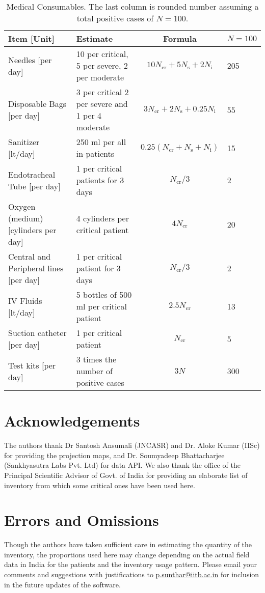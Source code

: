 \documentclass{article}
\newcommand{\email}[1]{\href{mailto:#1}{#1}}
\newcommand{\ncr}{\ensuremath{N_{\mathrm{cr}}}}
\newcommand{\ns}{\ensuremath{N_{\mathrm{s}}}}
\newcommand{\nin}{\ensuremath{N_{\mathrm{i}}}}
\begin{document}
\begin{landscape}
\begin{table}
  \caption{Medical Consumables. The last column is
    rounded number assuming a total positive cases of $N=100$.}
  \begin{tabularx}{\linewidth}{XXcl}
    \toprule
    Item [Unit] & Estimate & Formula & $N=100$ \\
    \midrule
Needles [per day]& 10 per critical, 5 per severe, 2 per moderate&
$10 \ncr + 5 \ns + 2 \nin$ & 205 \\
Disposable Bags [per day] & 3 per critical 2 per severe and 1 per 4
moderate & $ 3\ncr + 2\ns + 0.25\nin$ & 55 \\
Sanitizer [lt/day] & 250 ml per all in-patients & $0.25 (\ncr+\ns+\nin)$
& 15 \\
Endotracheal Tube [per day] & 1 per critical patients for 3 days &
$\ncr/3$ & 2 \\
Oxygen (medium) [cylinders per day] & 4 cylinders per critical patient
& $4 \ncr$  & 20 \\ 
Central and Peripheral lines [per day] & 1 per critical patient for 3
days & $\ncr/3$ & 2 \\
IV Fluids [lt/day] & 5 bottles of 500 ml per critical patient &
$2.5 \ncr$ & 13 \\
Suction catheter [per day] & 1 per critical patient & $\ncr$ & 5 \\
Test kits [per day] & 3 times the number of positive cases &
$3 N$ & 300  \\
\bottomrule
\end{tabularx}
\end{table}
\end{landscape}

\section{Acknowledgements}
The authors thank Dr Santosh Ansumali (JNCASR) and Dr. Aloke Kumar
(IISc) for providing the projection maps, and Dr. Soumyadeep
Bhattacharjee (Sankhyasutra Labs Pvt. Ltd) for data API. We also thank
the office of the Principal Scientific Advisor of Govt. of India for
providing an elaborate list of inventory from which some critical ones
have been used here.

\section{Errors and Omissions}
Though the authors have taken sufficient care in estimating the
quantity of the inventory, the proportions used here may change
depending on the actual field data in India for the patients and the
inventory usage pattern.  Please email your comments and suggestions
with justifications to \email{p.sunthar@iitb.ac.in} for inclusion in the
future updates of the software.
\end{document}

